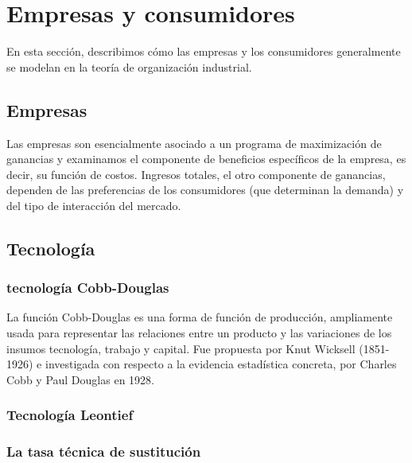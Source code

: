\documentclass[
]{article}
\begin{document}
\hypertarget{empresas-y-consumidores}{%
\section{Empresas y consumidores}\label{empresas-y-consumidores}}

En esta sección, describimos cómo las empresas y los consumidores
generalmente se modelan en la teoría de organización industrial.

\hypertarget{empresas}{%
\subsection{Empresas}\label{empresas}}

Las empresas son esencialmente asociado a un programa de maximización de
ganancias y examinamos el componente de beneficios específicos de la
empresa, es decir, su función de costos. Ingresos totales, el otro
componente de ganancias, dependen de las preferencias de los
consumidores (que determinan la demanda) y del tipo de interacción del
mercado.

\hypertarget{tecnologuxeda}{%
\subsection{Tecnología}\label{tecnologuxeda}}

\hypertarget{tecnologuxeda-cobb-douglas}{%
\subsubsection{tecnología
Cobb-Douglas}\label{tecnologuxeda-cobb-douglas}}

La función Cobb-Douglas es una forma de función de producción,
ampliamente usada para representar las relaciones entre un producto y
las variaciones de los insumos tecnología, trabajo y capital. Fue
propuesta por Knut Wicksell (1851-1926) e investigada con respecto a la
evidencia estadística concreta, por Charles Cobb y Paul Douglas en 1928.

\hypertarget{tecnologuxeda-leontief}{%
\subsubsection{Tecnología Leontief}\label{tecnologuxeda-leontief}}

\hypertarget{la-tasa-tuxe9cnica-de-sustituciuxf3n}{%
\subsubsection{La tasa técnica de
sustitución}\label{la-tasa-tuxe9cnica-de-sustituciuxf3n}}
\end{document}
